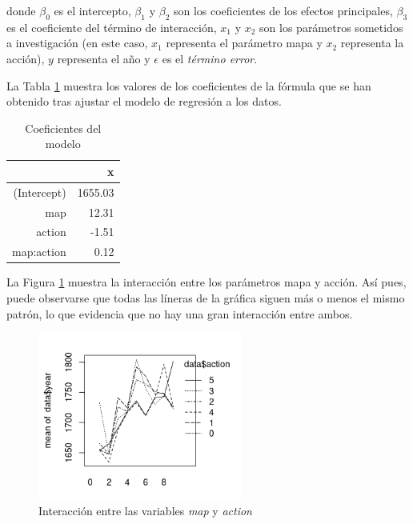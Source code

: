donde $\beta_0$ es el intercepto, $\beta_1$ y $\beta_2$ son los coeficientes de los efectos principales, $\beta_3$ es el coeficiente del término de interacción, $x_1$ y $x_2$ son los parámetros sometidos a investigación (en este caso, $x_1$ representa el parámetro mapa y $x_2$ representa la acción), $y$ representa el año y $\epsilon$ es el \emph{término error}.

La Tabla \ref{table:4} muestra los valores de los coeficientes de la fórmula que se han obtenido tras ajustar el modelo de regresión a los datos.

\begin{table}[ht]
\centering
\begin{tabular}{rr}
  \hline
 & x \\ 
  \hline
(Intercept) & 1655.03 \\ 
  map & 12.31 \\ 
  action & -1.51 \\ 
  map:action & 0.12 \\ 
   \hline
\end{tabular}
\caption{Coeficientes del modelo}
\label{table:4}
\end{table}

La Figura \ref{fig:interaccion} muestra la interacción entre los parámetros mapa y acción. Así pues, puede observarse que todas las líneras de la gráfica siguen más o menos el mismo patrón, lo que evidencia que no hay una gran interacción entre ambos.

\begin{figure}[h]
    \centering
    \includegraphics[width=0.60\textwidth]{imagenes/Rplot06.png}
    \caption{Interacción entre las variables \emph{map} y \emph{action}}
    \label{fig:interaccion}
\end{figure}

